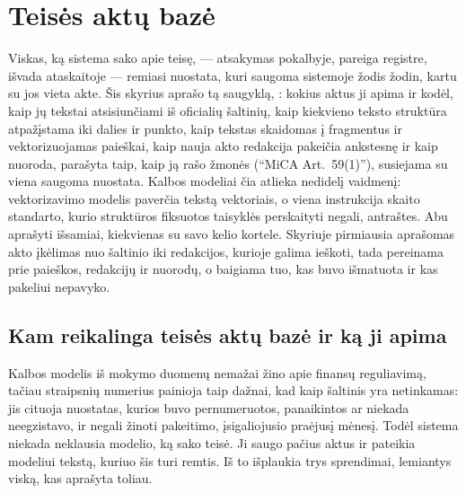 \chapter{Teisės aktų bazė}\label{ch:corpus}

Viskas, ką sistema sako apie teisę, --- atsakymas pokalbyje, pareiga registre, išvada
ataskaitoje --- remiasi nuostata, kuri saugoma sistemoje žodis žodin, kartu su jos vieta akte.
Šis skyrius aprašo tą saugyklą, : kokius aktus ji apima ir kodėl, kaip
jų tekstai atsisiunčiami iš oficialių šaltinių, kaip kiekvieno teksto struktūra atpažįstama iki
dalies ir punkto, kaip tekstas skaidomas į fragmentus ir vektorizuojamas paieškai, kaip nauja
akto redakcija pakeičia ankstesnę ir kaip nuoroda, parašyta taip, kaip ją rašo žmonės
(\enquote{MiCA Art.~59(1)}), susiejama su viena saugoma nuostata. Kalbos modeliai čia atlieka
nedidelį vaidmenį: vektorizavimo modelis paverčia tekstą vektoriais, o viena instrukcija
skaito standarto, kurio struktūros fiksuotos taisyklės perskaityti negali, antraštes. Abu
aprašyti išsamiai, kiekvienas su savo kelio kortele. Skyriuje pirmiausia aprašomas akto įkėlimas nuo
šaltinio iki redakcijos, kurioje galima ieškoti, tada pereinama prie paieškos, redakcijų ir nuorodų, o
baigiama tuo, kas buvo išmatuota ir kas pakeliui nepavyko.


\section{Kam reikalinga teisės aktų bazė ir ką ji apima}\label{sec:corpus:why}

Kalbos modelis iš mokymo duomenų nemažai žino apie finansų reguliavimą, tačiau straipsnių
numerius painioja taip dažnai, kad kaip šaltinis yra netinkamas: jis cituoja nuostatas, kurios
buvo pernumeruotos, panaikintos ar niekada neegzistavo, ir negali žinoti pakeitimo, įsigaliojusio
praėjusį mėnesį. Todėl sistema niekada neklausia modelio, ką sako teisė. Ji saugo pačius aktus
ir pateikia modeliui tekstą, kuriuo šis turi remtis. Iš to išplaukia trys sprendimai, lemiantys
viską, kas aprašyta toliau.

